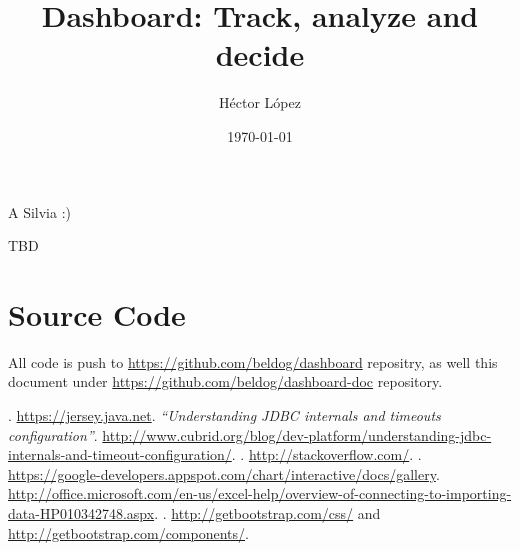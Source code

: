 \documentclass[a4paper,12pt,english]{book}
\newenvironment{dedication}
{
   \cleardoublepage
   \thispagestyle{empty}
   \vspace*{\stretch{1}}
   \hfill\begin{minipage}[t]{0.15\textwidth}
   \raggedright
}%
{
   \end{minipage}
   \vspace*{\stretch{3}}
   \clearpage
}
\begin{document}
\title{Dashboard: Track, analyze and decide}
\author{Héctor López}

\date{\today}
\maketitle

\begin{dedication}
A Silvia :)
\end{dedication}

%

\tableofcontents


TBD \\

\chapter*{Source Code}
All code is push to \url{https://github.com/beldog/dashboard} repositry, as well
this document under \url{https://github.com/beldog/dashboard-doc} repository.

%
%



% 


\begin{thebibliography}{1}

	. \url{https://jersey.java.net}.
	\bibitem{}{} 
		{\em ``Understanding JDBC internals and timeouts configuration''}.
		\url{http://www.cubrid.org/blog/dev-platform/understanding-jdbc-internals-and-timeout-configuration/}.
	. \url{http://stackoverflow.com/}.
	.
	\url{https://google-developers.appspot.com/chart/interactive/docs/gallery}.
	\url{http://office.microsoft.com/en-us/excel-help/overview-of-connecting-to-importing-data-HP010342748.aspx}.
	. \url{http://getbootstrap.com/css/}
	and \url{http://getbootstrap.com/components/}.
\end{thebibliography}
\end{document}
